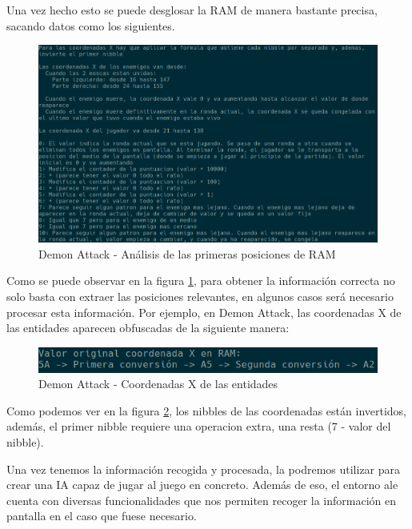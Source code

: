 Una vez hecho esto se puede desglosar la RAM de manera bastante precisa, sacando datos como los siguientes.

\begin{figure}[h]
	\centering
	\includegraphics[width=1\textwidth]{Figures/AnalisisRAM}
	\caption{Demon Attack - Análisis de las primeras posiciones de RAM}
	\label{fig:AnalisisRAM}
\end{figure}

Como se puede observar en la figura \ref{fig:AnalisisRAM}, para obtener la información correcta no solo basta con extraer las posiciones relevantes, en algunos casos será necesario procesar esta información. Por ejemplo, en Demon Attack, las coordenadas X de las entidades aparecen obfuscadas de la siguiente manera:

\begin{figure}[h]
	\centering
	\includegraphics[width=1\textwidth]{Figures/DAttackOpsRequired}
	\caption{Demon Attack - Coordenadas X de las entidades}
	\label{fig:DAttackOpsRequired}
\end{figure}

Como podemos ver en la figura \ref{fig:DAttackOpsRequired}, los nibbles de las coordenadas están invertidos, además, el primer nibble requiere una operacion extra, una resta (7 - valor del nibble). 

Una vez tenemos la información recogida y procesada, la podremos utilizar para crear una IA capaz de jugar al juego en concreto. Además de eso, el entorno \ac{ale} cuenta con diversas funcionalidades que nos permiten recoger la información en pantalla en el caso que fuese necesario. 


